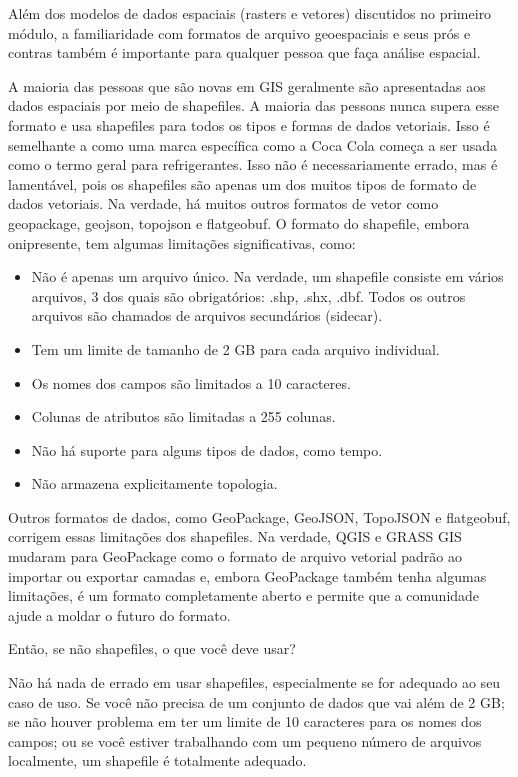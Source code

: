 \documentclass[
]{krantz}
\providecommand{\tightlist}{%
  \setlength{\itemsep}{0pt}\setlength{\parskip}{0pt}}
\begin{document}
Além dos modelos de dados espaciais (rasters e vetores) discutidos no primeiro módulo, a familiaridade com formatos de arquivo geoespaciais e seus prós e contras também é importante para qualquer pessoa que faça análise espacial.

A maioria das pessoas que são novas em GIS geralmente são apresentadas aos dados espaciais por meio de shapefiles. A maioria das pessoas nunca supera esse formato e usa shapefiles para todos os tipos e formas de dados vetoriais. Isso é semelhante a como uma marca específica como a Coca Cola começa a ser usada como o termo geral para refrigerantes. Isso não é necessariamente errado, mas é lamentável, pois os shapefiles são apenas um dos muitos tipos de formato de dados vetoriais. Na verdade, há muitos outros formatos de vetor como geopackage, geojson, topojson e flatgeobuf. O formato do shapefile, embora onipresente, tem algumas limitações significativas, como:

\begin{itemize}
\tightlist
\item
  Não é apenas um arquivo único. Na verdade, um shapefile consiste em vários arquivos, 3 dos quais são obrigatórios: .shp, .shx, .dbf. Todos os outros arquivos são chamados de arquivos secundários (sidecar).
\item
  Tem um limite de tamanho de 2 GB para cada arquivo individual.
\item
  Os nomes dos campos são limitados a 10 caracteres.
\item
  Colunas de atributos são limitadas a 255 colunas.
\item
  Não há suporte para alguns tipos de dados, como tempo.
\item
  Não armazena explicitamente topologia.
\end{itemize}

Outros formatos de dados, como GeoPackage, GeoJSON, TopoJSON e flatgeobuf, corrigem essas limitações dos shapefiles. Na verdade, QGIS e GRASS GIS mudaram para GeoPackage como o formato de arquivo vetorial padrão ao importar ou exportar camadas e, embora GeoPackage também tenha algumas limitações, é um formato completamente aberto e permite que a comunidade ajude a moldar o futuro do formato.

Então, se não shapefiles, o que você deve usar?

Não há nada de errado em usar shapefiles, especialmente se for adequado ao seu caso de uso. Se você não precisa de um conjunto de dados que vai além de 2 GB; se não houver problema em ter um limite de 10 caracteres para os nomes dos campos; ou se você estiver trabalhando com um pequeno número de arquivos localmente, um shapefile é totalmente adequado.
\end{document}
